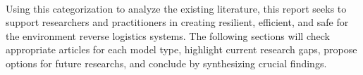 \paragraph{} Using this categorization to analyze the existing literature, this report seeks to support researchers and practitioners in creating resilient, efficient, and safe for the environment reverse logistics systems. The following sections will check appropriate articles for each model type, highlight current research gaps, propose options for future researchs, and conclude by synthesizing crucial findings.
